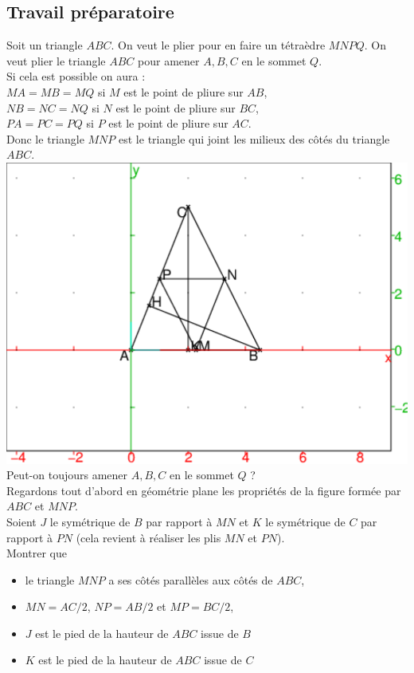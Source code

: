 \documentclass[a4paper,11pt]{book}
\begin{document}
\subsection{Travail pr\'eparatoire}
Soit un triangle $ABC$. On veut le plier pour en faire un t\'etra\`edre $MNPQ$.
On veut plier le triangle $ABC$ pour amener $A,B,C$ en le sommet $Q$.\\
Si cela est possible on aura :\\
$MA=MB=MQ$ si $M$  est le point de pliure sur $AB$,\\
$NB=NC=NQ$ si $N$ est le point de pliure sur $BC$,\\
$PA=PC=PQ$ si $P$ est le point de pliure sur $AC$.\\
Donc le triangle $MNP$ est le triangle qui joint les milieux des c\^ot\'es du 
triangle $ABC$.\\
\includegraphics[width=\textwidth]{troisgeo0}\\
Peut-on toujours amener $A,B,C$ en le sommet $Q$ ?\\
Regardons tout d'abord en g\'eom\'etrie plane les propri\'et\'es de la figure 
form\'ee par $ABC$ et $MNP$.\\
Soient $J$ le sym\'etrique de $B$ par rapport \`a $MN$ et $K$ le sym\'etrique de
$C$ par rapport \`a $PN$ (cela revient \`a r\'ealiser les plis $MN$ et $PN$).\\
Montrer que
\begin{itemize}
\item le triangle $MNP$ a ses c\^ot\'es parall\`eles aux c\^ot\'es de $ABC$,
\item $MN=AC/2$, $NP=AB/2$ et $MP=BC/2$,
\item $J$ est le pied de la hauteur de $ABC$ issue de $B$ 
\item $K$ est le pied de la hauteur de $ABC$ issue de $C$ 
\end{itemize}
\end{document}
